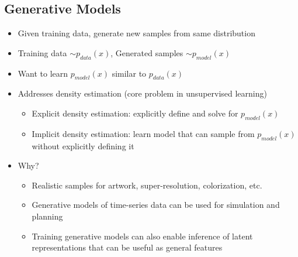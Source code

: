 \subsection{Generative Models}
\begin{itemize}
	\item Given training data, generate new samples from same distribution
	\item Training data $\sim p_{data}(x)$, Generated samples $\sim p_{model}(x)$
	\item Want to learn $p_{model}(x)$ similar to $p_{data}(x)$
	\item Addresses density estimation (core problem in unsupervised learning)
	\begin{itemize}
		\item Explicit density estimation: explicitly define and solve for $p_{model}(x)$
		\item Implicit density estimation: learn model that can sample from $p_{model}(x)$ without explicitly defining it
	\end{itemize}
	\item Why?
	\begin{itemize}
		\item Realistic samples for artwork, super-resolution, colorization, etc.
		\item Generative models of time-series data can be used for simulation and planning
		\item Training generative models can also enable inference of latent representations that can be useful as general features
	\end{itemize}
\end{itemize}

